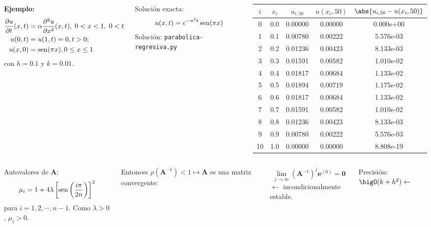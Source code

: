 \documentclass[9pt, aspectratio=169]{beamer}
\begin{document}
\begin{frame}
\begin{columns}
\textbf{Ejemplo:} 
\begin{align*}
\frac{\partial u}{\partial t} (x, t) &= \alpha \frac{\partial^2 u}{\partial x^2}(x, t), \; 0 < x < 1, \; 0 < t \\
u(0, t) &= u(1, t) = 0, t > 0; \\
u(x, 0) &= \operatorname{sen}(\pi x), 0 \leq x \leq 1
\end{align*}
con $h = 0.1$ y \alert{$k = 0.01$}.

Solución exacta:
\[u(x, t) = e^{-\pi^2 t} \operatorname{sen} (\pi x) \]
\centering Solución: \texttt{parabolica-regresiva.py}

\begin{center}
\begin{tabular}{ccccc}
\toprule
$i$ & $x_i$ & $u_{i,50}$ & $u(x_i, 50)$ & $\abs{u_{i, 50} - u(x_i, 50)}$ \\
\midrule
0 & 0.0 & 0.00000 & 0.00000 & 0.000e+00 \\
1 & 0.1 & 0.00780 & 0.00222 & 5.576e-03 \\
2 & 0.2 & 0.01236 & 0.00423 & 8.133e-03 \\
3 & 0.3 & 0.01591 & 0.00582 & 1.010e-02 \\
4 & 0.4 & 0.01817 & 0.00684 & 1.133e-02 \\
5 & 0.5 & 0.01894 & 0.00719 & 1.175e-02 \\
6 & 0.6 & 0.01817 & 0.00684 & 1.133e-02 \\
7 & 0.7 & 0.01591 & 0.00582 & 1.010e-02 \\
8 & 0.8 & 0.01236 & 0.00423 & 8.133e-03 \\
9 & 0.9 & 0.00780 & 0.00222 & 5.576e-03 \\
10 & 1.0 & 0.00000 & 0.00000 & 8.808e-19 \\
\bottomrule
\end{tabular} 
\end{center}
\end{columns} \pause
\begin{columns}
\cx
Autovalores de $\bm{A}$:
\[ \mu_i = 1 + 4 \lambda \left[ \operatorname{sen} \left(\frac{i \pi}{2 n}\right) \right]^2 \]
para $i = 1, 2, \cdots, n-1$. Como $\lambda > 0$, $\mu_i > 0$.

\cx
Entonces $\rho(\bm{A}^{-1}) < 1 \mapsto \bm{A}$ es una matriz convergente:
\begin{columns}
\[ \lim_{j \to \infty} (\bm{A}^{-1})^j \bm{e}^{(0)} = \bm{0} \]
$\leftarrow$ \alert{incondicionalmente estable}.
\end{columns} \pause
\centering Precisión: $\bigO(k + h^2) \leftarrow$ \faThumbsODown
\end{columns}
\end{frame}
\end{document}
